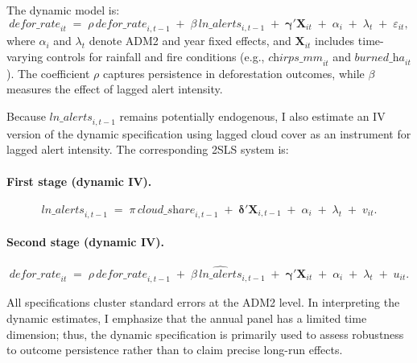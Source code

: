 \documentclass[hidelinks,12pt]{article}
\begin{document}
The dynamic model is:
\begin{equation}
\label{eq:dyn_structural}
  \textit{defor\_rate}_{it}
  \;=\;
  \rho\,\textit{defor\_rate}_{i,t-1}
  \;+\;
  \beta\,\textit{ln\_alerts}_{i,t-1}
  \;+\;
  \boldsymbol{\gamma}'\mathbf{X}_{it}
  \;+\;
  \alpha_i
  \;+\;
  \lambda_t
  \;+\;
  \varepsilon_{it},
\end{equation}
where $\alpha_i$ and $\lambda_t$ denote ADM2 and year fixed effects, and $\mathbf{X}_{it}$ includes time-varying controls for rainfall and fire conditions (e.g., $\textit{chirps\_mm}_{it}$ and $\textit{burned\_ha}_{it}$). The coefficient $\rho$ captures persistence in deforestation outcomes, while $\beta$ measures the effect of lagged alert intensity.

Because $\textit{ln\_alerts}_{i,t-1}$ remains potentially endogenous, I also estimate an IV version of the dynamic specification using lagged cloud cover as an instrument for lagged alert intensity. The corresponding 2SLS system is:

\paragraph{First stage (dynamic IV).}
\begin{equation}
\label{eq:dyn_first_stage}
  \textit{ln\_alerts}_{i,t-1}
  \;=\;
  \pi\,\textit{cloud\_share}_{i,t-1}
  \;+\;
  \boldsymbol{\delta}'\mathbf{X}_{i,t-1}
  \;+\;
  \alpha_i
  \;+\;
  \lambda_t
  \;+\;
  v_{it}.
\end{equation}

\paragraph{Second stage (dynamic IV).}
\begin{equation}
\label{eq:dyn_second_stage}
  \textit{defor\_rate}_{it}
  \;=\;
  \rho\,\textit{defor\_rate}_{i,t-1}
  \;+\;
  \beta\,\widehat{\textit{ln\_alerts}}_{i,t-1}
  \;+\;
  \boldsymbol{\gamma}'\mathbf{X}_{it}
  \;+\;
  \alpha_i
  \;+\;
  \lambda_t
  \;+\;
  u_{it}.
\end{equation}

All specifications cluster standard errors at the ADM2 level. In interpreting the dynamic estimates, I emphasize that the annual panel has a limited time dimension; thus, the dynamic specification is primarily used to assess robustness to outcome persistence rather than to claim precise long-run effects.

\end{document}
